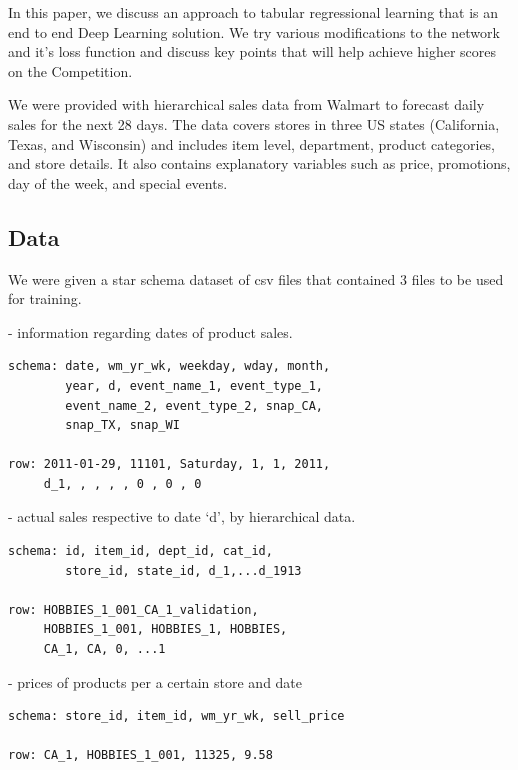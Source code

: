 \documentclass[10pt,twocolumn,letterpaper]{article}
\begin{document}
In this paper, we discuss an approach to tabular regressional learning that is
an end to end Deep Learning solution. We try various modifications to the
network and it's loss function and discuss key points that will help achieve
higher scores on the Competition.

We were provided with hierarchical sales data from Walmart to forecast daily
sales for the next 28 days. The data covers stores in three US states
(California, Texas, and Wisconsin) and includes item level, department, product
categories, and store details. It also contains explanatory variables such as
price, promotions, day of the week, and special events.



\subsection{Data}
  We were given a star schema dataset of csv files that contained 3 files to be
  used for training.

   - information regarding dates of product sales.
{\small\begin{verbatim}
schema: date, wm_yr_wk, weekday, wday, month,
        year, d, event_name_1, event_type_1,
        event_name_2, event_type_2, snap_CA,
        snap_TX, snap_WI

row: 2011-01-29, 11101, Saturday, 1, 1, 2011,
     d_1, , , , , 0 , 0 , 0
\end{verbatim}}




   - actual sales respective to date ‘d’, by hierarchical data.
  {\small\begin{verbatim}
schema: id, item_id, dept_id, cat_id,
        store_id, state_id, d_1,...d_1913

row: HOBBIES_1_001_CA_1_validation,
     HOBBIES_1_001, HOBBIES_1, HOBBIES,
     CA_1, CA, 0, ...1
  \end{verbatim}}


   - prices of products per a certain store and date

  {\small\begin{verbatim}
schema: store_id, item_id, wm_yr_wk, sell_price

row: CA_1, HOBBIES_1_001, 11325, 9.58
  \end{verbatim}}
\end{document}
